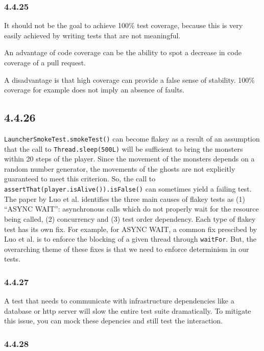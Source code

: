 \documentclass[]{article}
\begin{document}
\subsubsection{4.4.25}\label{section-14}

It should not be the goal to achieve 100\% test coverage, because this
is very easily achieved by writing tests that are not meaningful.

An advantage of code coverage can be the ability to spot a decrease in
code coverage of a pull request.

A disadvantage is that high coverage can provide a false sense of
stability. 100\% coverage for example does not imply an absence of
faults.

\subsection{4.4.26}\label{section-15}

\texttt{LauncherSmokeTest.smokeTest()} can become flakey as a result of
an assumption that the call to \texttt{Thread.sleep(500L)} will be
sufficient to bring the monsters within 20 steps of the player. Since
the movement of the monsters depends on a random number generator, the
movements of the ghosts are not explicitly guaranteed to meet this
criterion. So, the call to
\texttt{assertThat(player.isAlive()).isFalse()} can sometimes yield a
failing test. The paper by Luo et al. identifies the three main causes
of flakey tests as (1) ``ASYNC WAIT'': asynchronous calls which do not
properly wait for the resource being called, (2) concurrency and (3)
test order dependency. Each type of flakey test has its own fix. For
example, for ASYNC WAIT, a common fix prescibed by Luo et al. is to
enforce the blocking of a given thread through \texttt{waitFor}. But,
the overarching theme of these fixes is that we need to enforce
determinism in our tests.

\subsubsection{4.4.27}\label{section-16}

A test that needs to communicate with infrastructure dependencies like a
database or http server will slow the entire test suite dramatically. To
mitigate this issue, you can mock these depencies and still test the
interaction.

\subsubsection{4.4.28}\label{section-17}
\end{document}

